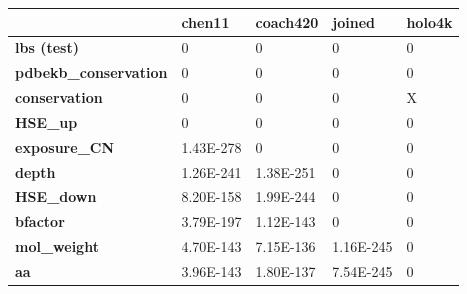 \begin{table}[]
\centering
\begin{tabular}{@{}lllll@{}}
\toprule
{\color[HTML]{000000} }       & {\color[HTML]{000000} \textbf{chen11}} & {\color[HTML]{000000} \textbf{coach420}} & {\color[HTML]{000000} \textbf{joined}} & {\color[HTML]{000000} \textbf{holo4k}} \\ \midrule
\textbf{lbs (test)}                  & 0                                      & 0                                        & 0                                      & 0                                      \\
\textbf{pdbekb\_conservation} & 0                                      & 0                                        & 0                                      & 0                                      \\
\textbf{conservation}         & 0                                      & 0                                        & 0                                      & X                                      \\
\textbf{HSE\_up}              & 0                                      & 0                                        & 0                                      & 0                                      \\
\textbf{exposure\_CN}         & 1.43E-278                              & 0                                        & 0                                      & 0                                      \\
\textbf{depth}                & 1.26E-241                              & 1.38E-251                                & 0                                      & 0                                      \\
\textbf{HSE\_down}            & 8.20E-158                              & 1.99E-244                                & 0                                      & 0                                      \\
\textbf{bfactor}              & 3.79E-197                              & 1.12E-143                                & 0                                      & 0                                      \\
\textbf{mol\_weight}          & 4.70E-143                              & 7.15E-136                                & 1.16E-245                              & 0                                      \\
\textbf{aa}                   & 3.96E-143                              & 1.80E-137                                & 7.54E-245                              & 0                                      \\

\end{tabular}
\end{table}
